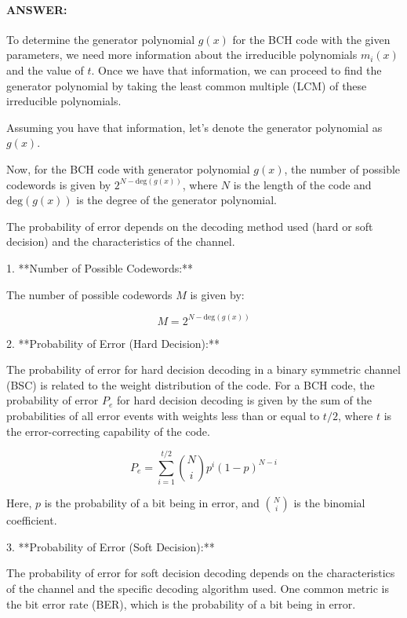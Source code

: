 \documentclass[colorlinks,11pt,a4paper,normalphoto,withhyper,ragged2e]{altareport}
\begin{document}
				\paragraph{ANSWER:}
				
				
				To determine the generator polynomial \( g(x) \) for the BCH code with the given parameters, we need more information about the irreducible polynomials \( m_i(x) \) and the value of \( t \). Once we have that information, we can proceed to find the generator polynomial by taking the least common multiple (LCM) of these irreducible polynomials.
				
				Assuming you have that information, let's denote the generator polynomial as \( g(x) \).
				
				Now, for the BCH code with generator polynomial \( g(x) \), the number of possible codewords is given by \( 2^{N - \text{{deg}}(g(x))} \), where \( N \) is the length of the code and \( \text{{deg}}(g(x)) \) is the degree of the generator polynomial.
				
				The probability of error depends on the decoding method used (hard or soft decision) and the characteristics of the channel.
				
				1. **Number of Possible Codewords:**
				
				The number of possible codewords \( M \) is given by:
				
				\[ M = 2^{N - \text{{deg}}(g(x))} \]
				
				2. **Probability of Error (Hard Decision):**
				
				The probability of error for hard decision decoding in a binary symmetric channel (BSC) is related to the weight distribution of the code. For a BCH code, the probability of error \( P_e \) for hard decision decoding is given by the sum of the probabilities of all error events with weights less than or equal to \( t/2 \), where \( t \) is the error-correcting capability of the code.
				
				\[ P_e = \sum_{i=1}^{t/2} \binom{N}{i} p^i (1-p)^{N-i} \]
				
				Here, \( p \) is the probability of a bit being in error, and \( \binom{N}{i} \) is the binomial coefficient.
				
				3. **Probability of Error (Soft Decision):**
				
				The probability of error for soft decision decoding depends on the characteristics of the channel and the specific decoding algorithm used. One common metric is the bit error rate (BER), which is the probability of a bit being in error.
				
\end{document}
